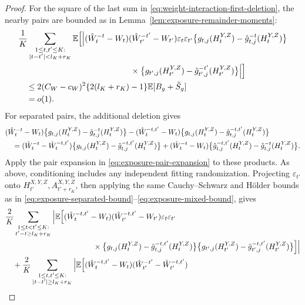 \documentclass[12pt]{article}
\def\E{\mathbb{E}}
\numberwithin{equation}{section}
\begin{document}
\begin{proof}
For the square of the last sum in
\eqref{eq:weight-interaction-first-deletion}, the nearby pairs
are bounded as in Lemma~\ref{lem:exposure-remainder-moments}:
\begin{align*}
&\frac1K\sum_{\substack{1\leq t,t'\leq K:\\
|t-t'|<l_K+r_K}}
\E\Big[
\Big|(\hat W_t^{-t}-W_t)(\hat W_{t'}^{-t'}-W_{t'})
\varepsilon_t\varepsilon_{t'}
\big\{g_{t,j}(H_t^{Y,Z})
-\hat g_{t,j}^{-t}(H_t^{Y,Z})\big\}\\
&\hspace{48mm}{}\times
\big\{g_{t',j}(H_{t'}^{Y,Z})
-\hat g_{t',j}^{-t'}(H_{t'}^{Y,Z})\big\}
\Big|
\Big]\\
&\quad\leq
2(C_W-c_W)^2\{2(l_K+r_K)-1\}\E[B_g+\tilde S_g]\\
&\quad=o(1).
\end{align*}
For separated pairs, the additional deletion gives
\begin{align}
&(\hat W_t^{-t}-W_t)
\big\{g_{t,j}(H_t^{Y,Z})
-\hat g_{t,j}^{-t}(H_t^{Y,Z})\big\}
-(\hat W_t^{-t,t'}-W_t)
\big\{g_{t,j}(H_t^{Y,Z})
-\hat g_{t,j}^{-t,t'}(H_t^{Y,Z})\big\}
\notag\\
&\quad=
(\hat W_t^{-t}-\hat W_t^{-t,t'})
\big\{g_{t,j}(H_t^{Y,Z})
-\hat g_{t,j}^{-t,t'}(H_t^{Y,Z})\big\}
+
(\hat W_t^{-t}-W_t)
\big\{\hat g_{t,j}^{-t,t'}(H_t^{Y,Z})
-\hat g_{t,j}^{-t}(H_t^{Y,Z})\big\}.
\label{eq:weight-interaction-second-deletion}
\end{align}
Apply the pair expansion in \eqref{eq:exposure-pair-expansion}
to these products. As above, conditioning includes any independent
fitting randomization.
Projecting \(\varepsilon_{t'}\) onto
\(H_{t'}^{X,Y,Z},A_{t'+r_K}^{X,Y,Z}\), then applying the same
Cauchy--Schwarz and H\"older bounds as in
\eqref{eq:exposure-separated-bound}--\eqref{eq:exposure-mixed-bound},
gives
\begin{align}
&\frac2K\sum_{\substack{1\leq t<t'\leq K:\\
t'-t\geq l_K+r_K}}
\Big|\E\Big[
(\hat W_t^{-t,t'}-W_t)(\hat W_{t'}^{-t,t'}-W_{t'})
\varepsilon_t\varepsilon_{t'}\notag\\*
&\hspace{40mm}{}\times
\big\{g_{t,j}(H_t^{Y,Z})
-\hat g_{t,j}^{-t,t'}(H_t^{Y,Z})\big\}
\big\{g_{t',j}(H_{t'}^{Y,Z})
-\hat g_{t',j}^{-t,t'}(H_{t'}^{Y,Z})\big\}
\Big]\Big|\notag\\
&\quad{}+\frac2K\sum_{\substack{1\leq t,t'\leq K:\\
|t-t'|\geq l_K+r_K}}
\Big|\E\Big[
(\hat W_t^{-t,t'}-W_t)
(\hat W_{t'}^{-t'}-\hat W_{t'}^{-t,t'})

\end{align}
\end{proof}
\end{document}
